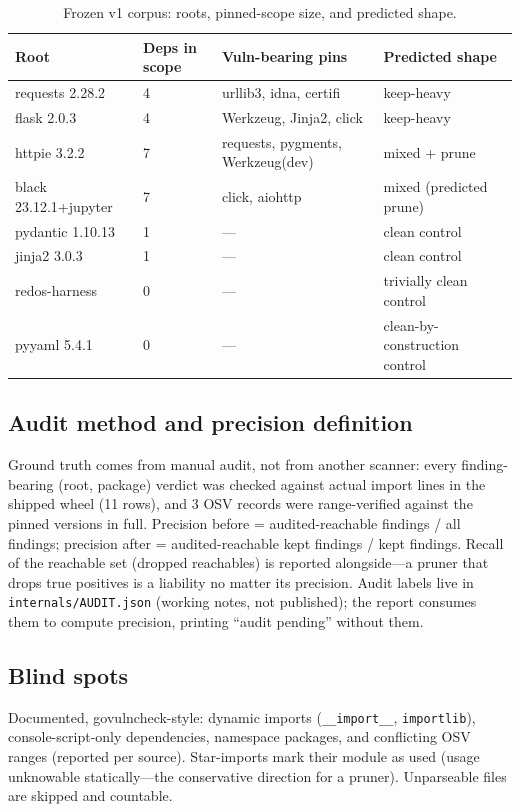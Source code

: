 \documentclass[11pt,a4paper]{article}
\begin{document}
\begin{table}[H]
\centering
\caption{Frozen v1 corpus: roots, pinned-scope size, and predicted shape.}
\label{tab:corpus}
\begin{tabular}{@{}llll@{}}
\toprule
Root & Deps in scope & Vuln-bearing pins & Predicted shape \\
\midrule
requests 2.28.2 & 4 & urllib3, idna, certifi & keep-heavy \\
flask 2.0.3 & 4 & Werkzeug, Jinja2, click & keep-heavy \\
httpie 3.2.2 & 7 & requests, pygments, Werkzeug(dev) & mixed + prune \\
black 23.12.1+jupyter & 7 & click, aiohttp & mixed (predicted prune) \\
pydantic 1.10.13 & 1 & --- & clean control \\
jinja2 3.0.3 & 1 & --- & clean control \\
redos-harness & 0 & --- & trivially clean control \\
pyyaml 5.4.1 & 0 & --- & clean-by-construction control \\
\bottomrule
\end{tabular}
\end{table}

\subsection{Audit method and precision definition}

Ground truth comes from manual audit, not from another scanner: every finding-bearing (root, package) verdict was checked against actual import lines in the shipped wheel (11 rows), and 3 OSV records were range-verified against the pinned versions in full. Precision before = audited-reachable findings / all findings; precision after = audited-reachable kept findings / kept findings. Recall of the reachable set (dropped reachables) is reported alongside---a pruner that drops true positives is a liability no matter its precision. Audit labels live in \verb!internals/AUDIT.json! (working notes, not published); the report consumes them to compute precision, printing ``audit pending'' without them.

\subsection{Blind spots}

Documented, govulncheck-style: dynamic imports (\verb!__import__!, \verb!importlib!), console-script-only dependencies, namespace packages, and conflicting OSV ranges (reported per source). Star-imports mark their module as used (usage unknowable statically---the conservative direction for a pruner). Unparseable files are skipped and countable.
\end{document}
